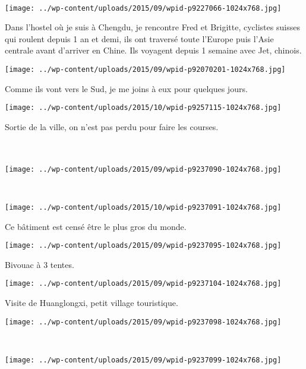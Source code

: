 ~
\begin{center} \texttt{[image: ../wp-content/uploads/2015/09/wpid-p9227066-1024x768.jpg]} \end{center}
\vspace{-\topsep}
\pagebreak

 Dans l'hostel où je suis à Chengdu, je rencontre Fred et Brigitte, cyclistes suisses qui roulent depuis 1 an et demi, ils ont traversé toute l'Europe puis l'Asie centrale avant d'arriver en Chine. Ils voyagent depuis 1 semaine avec Jet, chinois. 
\begin{center} \texttt{[image: ../wp-content/uploads/2015/09/wpid-p92070201-1024x768.jpg]} \end{center}

 Comme ils vont vers le Sud, je me joins à eux pour quelques jours. 
\begin{center} \texttt{[image: ../wp-content/uploads/2015/10/wpid-p9257115-1024x768.jpg]} \end{center}
\vspace{-\topsep}
\pagebreak

  Sortie de la ville, on n'est pas perdu pour faire les courses. \\~\\~\\
\begin{center} \texttt{[image: ../wp-content/uploads/2015/09/wpid-p9237090-1024x768.jpg]} \end{center}

~
\begin{center} \texttt{[image: ../wp-content/uploads/2015/10/wpid-p9237091-1024x768.jpg]} \end{center}
\vspace{-\topsep}
\pagebreak

  Ce bâtiment est censé être le plus gros du monde. 
\begin{center} \texttt{[image: ../wp-content/uploads/2015/09/wpid-p9237095-1024x768.jpg]} \end{center}

 Bivouac à 3 tentes. 
\begin{center} \texttt{[image: ../wp-content/uploads/2015/09/wpid-p9237104-1024x768.jpg]} \end{center}
\vspace{-\topsep}
\pagebreak
 
 Visite de Huanglongxi, petit village touristique. 
\begin{center} \texttt{[image: ../wp-content/uploads/2015/09/wpid-p9237098-1024x768.jpg]} \end{center}
~
\begin{center} \texttt{[image: ../wp-content/uploads/2015/09/wpid-p9237099-1024x768.jpg]} \end{center}
\vspace{-\topsep}
\pagebreak
 
